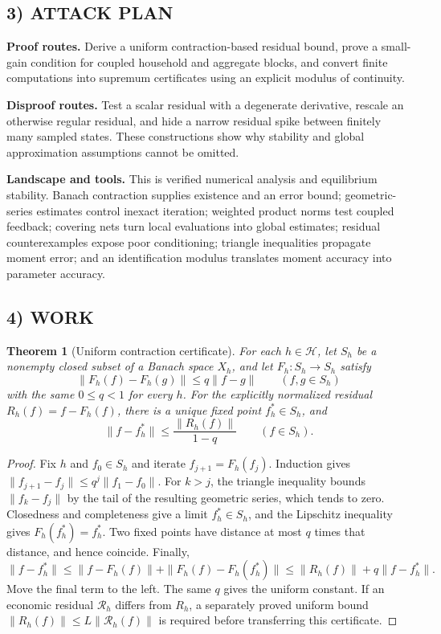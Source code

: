 \documentclass[11pt,a4paper]{article}
\newtheorem{theorem}{Theorem}
\theoremstyle{definition}
\begin{document}
\subsection*{3) ATTACK PLAN}
\textbf{Proof routes.} Derive a uniform contraction-based residual bound, prove a small-gain condition for coupled household and aggregate blocks, and convert finite computations into supremum certificates using an explicit modulus of continuity.

\textbf{Disproof routes.} Test a scalar residual with a degenerate derivative, rescale an otherwise regular residual, and hide a narrow residual spike between finitely many sampled states. These constructions show why stability and global approximation assumptions cannot be omitted.

\textbf{Landscape and tools.} This is verified numerical analysis and equilibrium stability. Banach contraction supplies existence and an error bound; geometric-series estimates control inexact iteration; weighted product norms test coupled feedback; covering nets turn local evaluations into global estimates; residual counterexamples expose poor conditioning; triangle inequalities propagate moment error; and an identification modulus translates moment accuracy into parameter accuracy.

\subsection*{4) WORK}
\begin{theorem}[Uniform contraction certificate]
For each $h\in\mathcal H$, let $S_h$ be a nonempty closed subset of a Banach space $X_h$, and let $F_h:S_h\to S_h$ satisfy
\[
 \|F_h(f)-F_h(g)\|\le q\|f-g\|\qquad(f,g\in S_h)
\]
with the same $0\le q<1$ for every $h$. For the explicitly normalized residual $R_h(f)=f-F_h(f)$, there is a unique fixed point $f_h^*\in S_h$, and
\[
 \|f-f_h^*\|\le\frac{\|R_h(f)\|}{1-q}\qquad(f\in S_h).
\]
\end{theorem}
\begin{proof}
Fix $h$ and $f_0\in S_h$ and iterate $f_{j+1}=F_h(f_j)$. Induction gives
$\|f_{j+1}-f_j\|\le q^j\|f_1-f_0\|$.
For $k>j$, the triangle inequality bounds $\|f_k-f_j\|$ by the tail of the resulting geometric series, which tends to zero. Closedness and completeness give a limit $f_h^*\in S_h$, and the Lipschitz inequality gives $F_h(f_h^*)=f_h^*$. Two fixed points have distance at most $q$ times that distance, and hence coincide. Finally,
\[
 \|f-f_h^*\|\le\|f-F_h(f)\|+\|F_h(f)-F_h(f_h^*)\|
 \le\|R_h(f)\|+q\|f-f_h^*\|.
\]
Move the final term to the left. The same $q$ gives the uniform constant. If an economic residual $\mathcal R_h$ differs from $R_h$, a separately proved uniform bound $\|R_h(f)\|\le L\|\mathcal R_h(f)\|$ is required before transferring this certificate.
\end{proof}
\end{document}
